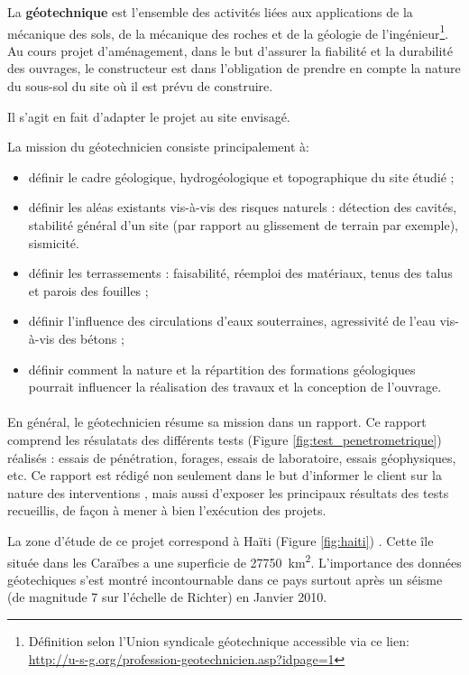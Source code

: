 \par 
La \textbf{géotechnique} est l’ensemble des 
activités liées aux applications de la mécanique des sols, de la mécanique 
des roches et de la géologie de l’ingénieur\footnote{
    Définition selon l’Union syndicale géotechnique accessible via ce lien: 
    \url{http://u-s-g.org/profession-geotechnicien.asp?idpage=1}}.
Au cours projet d'aménagement, dans le but d'assurer  la fiabilité et la durabilité
des ouvrages, le constructeur est dans l'obligation de prendre en compte
la nature du sous-sol du site où il est prévu de construire.

Il s'agit en fait d'adapter le projet au site envisagé.
\par
La mission du géotechnicien consiste principalement à:
\begin{itemize}
    \item définir le cadre géologique, hydrogéologique et topographique 
    du site étudié ;
    \item définir les aléas existants vis-à-vis des risques naturels : 
    détection des cavités, stabilité général d’un site (par rapport au 
    glissement de terrain par exemple), sismicité.
    \item définir les terrassements : faisabilité, réemploi des matériaux, 
    tenus des talus et parois des fouilles ;
    \item définir l’influence des circulations d’eaux souterraines, 
    agressivité de l’eau vis-à-vis des bétons ;
    \item définir comment la nature et la répartition des 
    formations géologiques pourrait influencer la réalisation des travaux et la conception 
    de l’ouvrage.
\end{itemize}
\paragraph{}
En général, le géotechnicien résume sa mission dans un rapport.
Ce rapport comprend les résulatats des différents tests (Figure \ref{fig:test_penetrometrique}) réalisés : essais de pénétration, forages, essais de laboratoire,
essais géophysiques, etc.
Ce rapport est rédigé non seulement dans le but d’informer le client sur la nature des interventions
, mais aussi d’exposer les principaux résultats des tests recueillis, de façon à mener à bien
l’exécution des projets.
\par
La zone d'étude de ce projet correspond à Haïti (Figure \ref{fig:haiti}) .
Cette île située dans les Caraïbes a une superficie de  \SI{27750}{\kilo\metre\squared}.
L'importance des données géotechiques s'est montré incontournable dans ce pays surtout 
après un séisme (de magnitude 7 sur l'échelle de Richter) en Janvier 2010.

